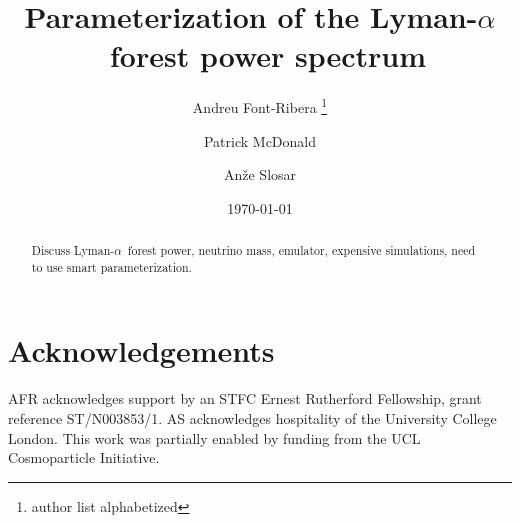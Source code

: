 \documentclass[preprintnumbers,prd,superscriptaddress,notitlepage,nofootinbib] {revtex4-1}
\newcommand{\lya}{Lyman-$\alpha$}
\begin{document}
\title{Parameterization of the \lya\ forest power spectrum}

\author{Andreu Font-Ribera \footnote{author list alphabetized}}
\author{Patrick McDonald}
\author{An\v{z}e Slosar}

\date{\today}

\begin{abstract}
Discuss \lya\ forest power, neutrino mass, emulator, expensive
simulations, need to use smart parameterization.
\end{abstract}

\maketitle















\section*{Acknowledgements}
AFR acknowledges support by an STFC Ernest Rutherford Fellowship, grant reference ST/N003853/1.
AS acknowledges hospitality of the University College London.
This work was partially enabled by funding from the UCL Cosmoparticle
Initiative.




\end{document}
